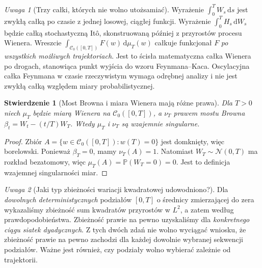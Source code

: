 \documentclass[11pt,a4paper,oneside]{report}
\numberwithin{equation}{chapter}
\theoremstyle{plain}
\newtheorem{stwierdzenie}[twierdzenie]{Stwierdzenie}
\theoremstyle{definition}
\theoremstyle{remark}
\newtheorem{uwaga}{Uwaga}[chapter]
\newcommand{\Prob}{\mathbb{P}}
\newcommand{\calC}{\mathcal{C}}
\newcommand{\dd}{\mathrm{d}}
\newcommand{\Normal}{\mathcal{N}}
\begin{document}
\begin{uwaga}[Trzy całki, których nie wolno utożsamiać]
Wyrażenie $\int_0^T W_s\,\dd s$ jest zwykłą całką
po czasie z jednej losowej, ciągłej funkcji.
Wyrażenie $\int_0^T H_s\,\dd W_s$ będzie całką
stochastyczną Itô, skonstruowaną później z przyrostów
procesu Wienera. Wreszcie
$\int_{\calC_0([0,T])}F(w)\,\dd\mu_T(w)$
całkuje funkcjonał $F$ \emph{po wszystkich możliwych
trajektoriach}. Jest to ścisła matematyczna całka Wienera
po drogach, stanowiąca punkt wyjścia do wzoru
Feynmana--Kaca. Oscylacyjna całka Feynmana w czasie
rzeczywistym wymaga odrębnej analizy i nie jest
zwykłą całką względem miary probabilistycznej.
\end{uwaga}


\begin{stwierdzenie}[Most Browna i miara Wienera mają różne prawa]
Dla $T>0$ niech $\mu_T$ będzie miarą Wienera na
$\calC_0([0,T])$, a $\nu_T$ prawem mostu Browna
$\beta_t=W_t-(t/T)W_T$. Wtedy $\mu_T$ i $\nu_T$
są wzajemnie singularne.
\end{stwierdzenie}
\begin{proof}
Zbiór $A=\{w\in\calC_0([0,T]):w(T)=0\}$ jest domknięty,
więc borelowski. Ponieważ $\beta_T=0$, mamy $\nu_T(A)=1$.
Natomiast $W_T\sim\Normal(0,T)$ ma rozkład bezatomowy,
więc $\mu_T(A)=\Prob(W_T=0)=0$. Jest to definicja
wzajemnej singularności miar.
\end{proof}

\begin{uwaga}[Jaki typ zbieżności wariacji kwadratowej udowodniono?]
Dla \emph{dowolnych deterministycznych} podziałów
$[0,T]$ o średnicy zmierzającej do zera wykazaliśmy
zbieżność sum kwadratów przyrostów w $L^2$, a zatem
według prawdopodobieństwa. Zbieżność prawie na pewno
uzyskaliśmy dla \emph{konkretnego ciągu siatek dyadycznych}.
Z tych dwóch zdań nie wolno wyciągać wniosku, że
zbieżność prawie na pewno zachodzi dla każdej dowolnie
wybranej sekwencji podziałów. Ważne jest również,
czy podziały wolno wybierać zależnie od trajektorii.
\end{uwaga}
\end{document}
